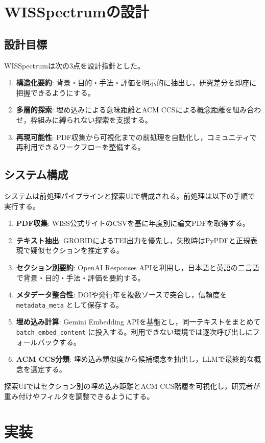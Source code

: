 \documentclass[twoside]{wiss}
\begin{document}
\section{WISSpectrumの設計}
\subsection{設計目標}
WISSpectrumは次の3点を設計指針とした。
\begin{enumerate}
 \item \textbf{構造化要約}: 背景・目的・手法・評価を明示的に抽出し，研究差分を即座に把握できるようにする。
 \item \textbf{多層的探索}: 埋め込みによる意味距離とACM CCSによる概念距離を組み合わせ，枠組みに縛られない探索を支援する。
 \item \textbf{再現可能性}: PDF収集から可視化までの前処理を自動化し，コミュニティで再利用できるワークフローを整備する。
\end{enumerate}

\subsection{システム構成}
システムは前処理パイプラインと探索UIで構成される。前処理は以下の手順で実行する。
\begin{enumerate}
 \item \textbf{PDF収集}: WISS公式サイトのCSVを基に年度別に論文PDFを取得する。
 \item \textbf{テキスト抽出}: GROBIDによるTEI出力を優先し，失敗時はPyPDFと正規表現で疑似セクションを推定する。
 \item \textbf{セクション別要約}: OpenAI Responses APIを利用し，日本語と英語の二言語で背景・目的・手法・評価を要約する。
 \item \textbf{メタデータ整合性}: DOIや発行年を複数ソースで突合し，信頼度を \texttt{metadata\_meta} として保存する。
 \item \textbf{埋め込み計算}: Gemini Embedding APIを基盤とし，同一テキストをまとめて \texttt{batch\_embed\_content} に投入する。利用できない環境では逐次呼び出しにフォールバックする。
 \item \textbf{ACM CCS分類}: 埋め込み類似度から候補概念を抽出し，LLMで最終的な概念を選定する。
\end{enumerate}
探索UIではセクション別の埋め込み距離とACM CCS階層を可視化し，研究者が重み付けやフィルタを調整できるようにする。

\section{実装}
\end{document}
